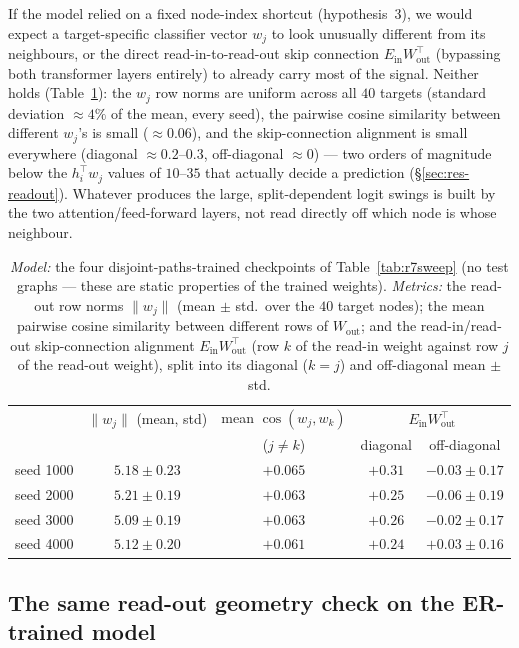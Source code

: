 \documentclass[11pt,a4paper]{article}
\begin{document}
If the model relied on a fixed node-index shortcut (hypothesis~3), we would
expect a target-specific classifier vector $w_j$ to look unusually different
from its neighbours, or the direct read-in-to-read-out skip connection
$E_{\mathrm{in}}W_{\mathrm{out}}^\top$ (bypassing both transformer layers
entirely) to already carry most of the signal. Neither holds
(Table~\ref{tab:r7wout}): the $w_j$ row norms are uniform across all $40$
targets (standard deviation $\approx4\%$ of the mean, every seed), the
pairwise cosine similarity between different $w_j$'s is small
($\approx0.06$), and the skip-connection alignment is small everywhere
(diagonal $\approx0.2$--$0.3$, off-diagonal $\approx0$) --- two orders of
magnitude below the $h_i^\top w_j$ values of $10$--$35$ that actually decide a
prediction (\S\ref{sec:res-readout}). Whatever produces the large, split-dependent
logit swings is built by the two attention/feed-forward layers, not read
directly off which node is whose neighbour.

\begin{table}[H]\centering\small
\begin{tabular}{lcccc}
\toprule
 & $\|w_j\|$ (mean, std) & mean $\cos(w_j,w_k)$ & \multicolumn{2}{c}{$E_{\mathrm{in}}W_{\mathrm{out}}^\top$}\\
 & & ($j\neq k$) & diagonal & off-diagonal\\
\midrule
seed 1000 & $5.18\pm0.23$ & $+0.065$ & $+0.31$ & $-0.03\pm0.17$\\
seed 2000 & $5.21\pm0.19$ & $+0.063$ & $+0.25$ & $-0.06\pm0.19$\\
seed 3000 & $5.09\pm0.19$ & $+0.063$ & $+0.26$ & $-0.02\pm0.17$\\
seed 4000 & $5.12\pm0.20$ & $+0.061$ & $+0.24$ & $+0.03\pm0.16$\\
\bottomrule\end{tabular}
\caption{\emph{Model:} the four disjoint-paths-trained checkpoints of
Table~\ref{tab:r7sweep} (no test graphs --- these are static properties of the
trained weights). \emph{Metrics:} the read-out row norms $\|w_j\|$ (mean $\pm$
std.\ over the $40$ target nodes); the mean pairwise cosine similarity between
different rows of $W_{\mathrm{out}}$; and the read-in/read-out skip-connection
alignment $E_{\mathrm{in}}W_{\mathrm{out}}^\top$ (row $k$ of the read-in weight
against row $j$ of the read-out weight), split into its diagonal ($k=j$) and
off-diagonal mean $\pm$ std.}
\label{tab:r7wout}
\end{table}

\subsection{The same read-out geometry check on the ER-trained model}
\label{sec:res-wout-er}
\end{document}
